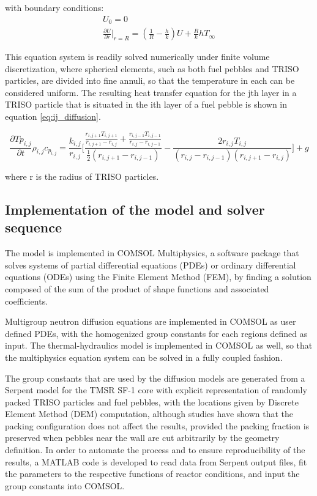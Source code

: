 \documentclass{elsarticle}
\begin{document}
with boundary conditions:
\begin{align}
U_0 = 0\\
\frac{\partial U}{\partial r} |_{r=R} = \left( \frac{1}{R} - \frac{h}{k}\right) U + \frac{R}{k}hT_{\infty}
\end{align}

This equation system is readily solved numerically under finite volume discretization, where spherical elements, such as both fuel pebbles and TRISO particles, are divided into fine annuli, so that the temperature in each can be considered uniform. 
The resulting heat transfer equation for the jth layer in a TRISO particle that is situated in the ith layer of a fuel pebble is shown in equation \ref{eq:ij_diffusion}.

\begin{equation}
    \frac{\partial{Tp_{i,j}}}{\partial{t}}\rho_{i,j}c_{p_{i,j}} = \frac{k_{i,j}}{r_{i,j}}   \Bigg[  \frac {\frac{r_{i,j+1}T_{i,j+1}}{r_{i,j+1}-r_{i,j}}+\frac{r_{i,j-1}T_{i, j-1}}{r_{i,j}-r_ {i, j-1}  }}{\frac{1}{2}(r_ {i, j+1} -r_ {i, j-1} )}-\frac{2r_ {i, j} T_ {i,j} }{(r_ {i,j} -r_ {i,j-1} )(r_ {i, j+1} -r_ {i,j})} \Bigg]  + g  
    \label{eq:ij_diffusion}
\end{equation}

where r is the radius of TRISO particles.





\subsection{Implementation of the model and solver sequence}
\label{sec:implementation}

The model is implemented in COMSOL Multiphysics, a software package that solves systems of partial differential equations (PDEs) or ordinary differential equations (ODEs) using the Finite Element Method (FEM), by finding a solution composed of the sum of the product of shape functions and associated coefficients. 

Multigroup neutron diffusion equations are implemented in COMSOL as user defined PDEs, with the homogenized group constants for each regions defined as input. The thermal-hydraulics model is implemented in COMSOL as well, so that the multiphysics equation system can be solved in a fully coupled fashion. 

The group constants that are used by the diffusion models are generated from a Serpent model for the TMSR SF-1 core with explicit representation of randomly packed TRISO particles and fuel pebbles, with the locations given by Discrete Element Method (DEM) computation, although studies\cite{Fratoni2007} have shown that the packing configuration does not affect the results, provided the packing fraction is preserved when pebbles near the wall are cut arbitrarily by the geometry definition. 
In order to automate the process and to ensure reproducibility of the results, a MATLAB code is developed to read data from Serpent output files, fit the parameters to the respective functions of reactor conditions, and input the group constants into COMSOL. 
\end{document}
